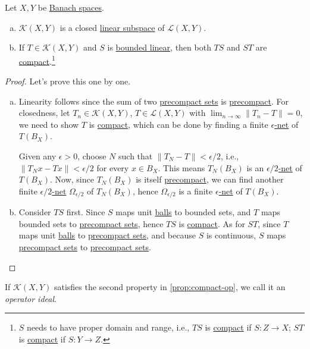 \begin{proposition}\label{prop:compact-op}
	Let \(X, Y\) be \hyperref[def:Banach-space]{Banach spaces}.
	\begin{enumerate}[(a)]
		\item \(\mathcal{K}(X, Y)\) is a closed \hyperref[def:linear-vector-space]{linear subspace} of \(\mathcal{L} (X, Y)\).
		\item If \(T\in \mathcal{K}(X, Y)\) and \(S\) is \hyperref[def:bounded-linear-op]{bounded linear}, then both \(TS\) and \(ST\) are \hyperref[def:compact-op]{compact}.\footnote{\(S\) needs to have proper domain and range, i.e., \(TS\) is \hyperref[def:compact-op]{compact} if \(S\colon Z\to X\); \(ST\) is \hyperref[def:compact-op]{compact} if \(S\colon Y\to Z\).}
	\end{enumerate}
\end{proposition}
\begin{proof}
	Let's prove this one by one.
	\begin{enumerate}[(a)]
		\item Linearity follows since the sum of two \hyperref[def:precompact]{precompact sets} is \hyperref[def:precompact]{precompact}. For closedness, let \(T_n\in \mathcal{K}(X, Y)\), \(T\in \mathcal{L} (X, Y)\) with \(\lim_{n \to \infty} \left\lVert T_n - T\right\rVert = 0\), we need to show \(T\) is \hyperref[def:compact-op]{compact}, which can be done by finding a finite \hyperref[def:eps-net]{\(\epsilon \)-net} of \(T(B_X)\).

		      Given any \(\epsilon >0\), choose \(N\) such that \(\left\lVert T_N - T\right\rVert < \epsilon / 2\), i.e., \(\lVert T_N x - Tx \rVert < \epsilon / 2\) for every \(x\in B_X\). This means \(T_N(B_X)\) is an \hyperref[def:eps-net]{\(\epsilon /2\)-net} of \(T(B_X)\). Now, since \(T_N (B_X)\) is itself \hyperref[def:precompact]{precompact}, we can find another finite \hyperref[def:eps-net]{\(\epsilon / 2\)-net} \(\Omega _{\epsilon /2}\) of \(T_N(B_X)\), hence \(\Omega _{\epsilon / 2}\) is a finite \hyperref[def:eps-net]{\(\epsilon \)-net} of \(T(B_X)\).
		\item Consider \(TS\) first. Since \(S\) maps unit \hyperref[def:ball]{balls} to bounded sets, and \(T\) maps bounded sets to \hyperref[def:precompact]{precompact sets}, hence \(TS\) is \hyperref[def:compact-op]{compact}. As for \(ST\), since \(T\) maps unit \hyperref[def:ball]{balls} to \hyperref[def:precompact]{precompact sets}, and because \(S\) is continuous, \(S\) maps \hyperref[def:precompact]{precompact sets} to \hyperref[def:precompact]{precompact sets}.
	\end{enumerate}
\end{proof}

\begin{remark}
	If \(\mathcal{K}(X, Y)\) satisfies the second property in \autoref{prop:compact-op}, we call it an \emph{operator ideal}.
\end{remark}